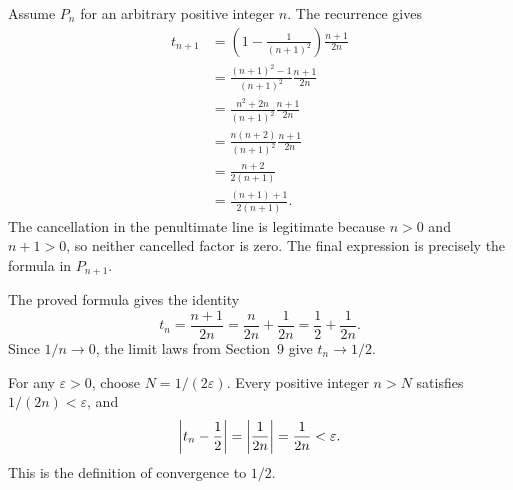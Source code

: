 Assume $P_n$ for an arbitrary positive integer $n$.
The recurrence gives
\begin{align*}
 t_{n+1}
   &=\left(1-\frac1{(n+1)^2}\right)\frac{n+1}{2n}\\
   &=\frac{(n+1)^2-1}{(n+1)^2}\frac{n+1}{2n}\\
   &=\frac{n^2+2n}{(n+1)^2}\frac{n+1}{2n}\\
   &=\frac{n(n+2)}{(n+1)^2}\frac{n+1}{2n}\\
   &=\frac{n+2}{2(n+1)}\\
   &=\frac{(n+1)+1}{2(n+1)}.
\end{align*}
The cancellation in the penultimate line is legitimate because
$n>0$ and $n+1>0$, so neither cancelled factor is zero.
The final expression is precisely the formula in $P_{n+1}$.


The proved formula gives the identity
\[
 t_n=\frac{n+1}{2n}
     =\frac n{2n}+\frac1{2n}
     =\frac12+\frac1{2n}.
\]
Since $1/n\to0$, the limit laws from Section~9 give
$t_n\to1/2$.

For any $\varepsilon>0$, choose $N=1/(2\varepsilon)$.
Every positive integer $n>N$ satisfies $1/(2n)<\varepsilon$, and
\[
 \left|t_n-\frac12\right|
 =\left|\frac1{2n}\right|
 =\frac1{2n}
 <\varepsilon.
\]
This is the definition of convergence to $1/2$.

